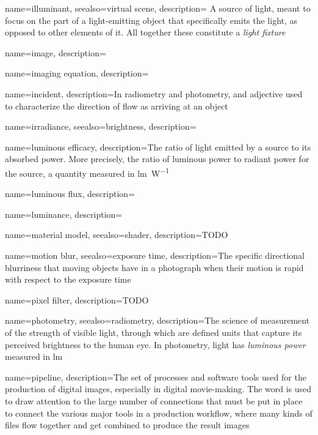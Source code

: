 {
	name=illuminant,
	seealso={virtual scene},
	description={
		A source of light, meant to focus on the part of a light-emitting object that
	    specifically emits the light, as opposed to other elements of it. All together
        these constitute a \textsl{light fixture}}
}

{
	name={image},
	description=\nopostdesc
}

{
	name={imaging equation},
	description=\nopostdesc
}
	
{
	name={incident},
	description={In radiometry and photometry, and adjective used to characterize the direction of
		flow as arriving at an object}
}

{
	name=irradiance,
	seealso={brightness},
	description=\nopostdesc
}

{
	name={luminous efficacy},
	description={The ratio of light emitted by a source to its absorbed power.
		More precisely, the ratio of luminous power to radiant power for the source,
		a quantity measured in \unit{\lumen\per\watt}}
}

{
	name={luminous flux},
	description=\nopostdesc
}

{
	name={luminance},
	description=\nopostdesc
}

{
	name={material model},
	seealso={shader},
	description={TODO}
}

{
	name={motion blur},
	seealso={exposure time},
	description={The specific directional blurriness that moving objects
		have in a photograph when their motion is rapid with respect 
		to the \gls{exposure time}}
}

{
	name={pixel filter},
	description={TODO}
}

{
	name={photometry},
	seealso={radiometry},
	description={The science of measurement of the strength of visible light, 
		through which are defined units that capture its perceived brightness 
		to the human eye. In photometry, light has \textsl{luminous power} 
		measured in \unit{\lumen}}
}


{
	name={pipeline},
	description={The set of processes and software tools used for the production of 
		digital images, especially in digital movie-making. The word is used to draw
		attention to the large number of connections that must be put in place to 
		connect the various major tools in a production workflow, where many kinds
		of files flow together and get combined to produce the result images}
}


